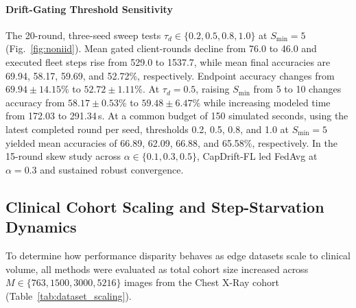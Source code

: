 \documentclass[conference]{IEEEtran}
\begin{document}
\paragraph{Drift-Gating Threshold Sensitivity}
The 20-round, three-seed sweep tests $\tau_d\in\{0.2,0.5,0.8,1.0\}$ at $S_{\min}=5$ (Fig.~\ref{fig:noniid}). Mean gated client-rounds decline from 76.0 to 46.0 and executed fleet steps rise from 529.0 to 1537.7, while mean final accuracies are 69.94, 58.17, 59.69, and 52.72\%, respectively. Endpoint accuracy changes from $69.94\pm14.15\%$ to $52.72\pm1.11\%$. At $\tau_d=0.5$, raising $S_{\min}$ from 5 to 10 changes accuracy from $58.17\pm0.53\%$ to $59.48\pm6.47\%$ while increasing modeled time from 172.03 to 291.34\,s. At a common budget of 150 simulated seconds, using the latest completed round per seed, thresholds 0.2, 0.5, 0.8, and 1.0 at $S_{\min}=5$ yielded mean accuracies of 66.89, 62.09, 66.88, and 65.58\%, respectively. In the 15-round skew study across $\alpha \in \{0.1, 0.3, 0.5\}$, CapDrift-FL led FedAvg at $\alpha=0.3$ and sustained robust convergence.

\subsection{Clinical Cohort Scaling and Step-Starvation Dynamics}\label{subsec:cohort_scaling}
To determine how performance disparity behaves as edge datasets scale to clinical volume, all methods were evaluated as total cohort size increased across $M \in \{763, 1500, 3000, 5216\}$ images from the Chest X-Ray cohort (Table~\ref{tab:dataset_scaling}).
\end{document}
